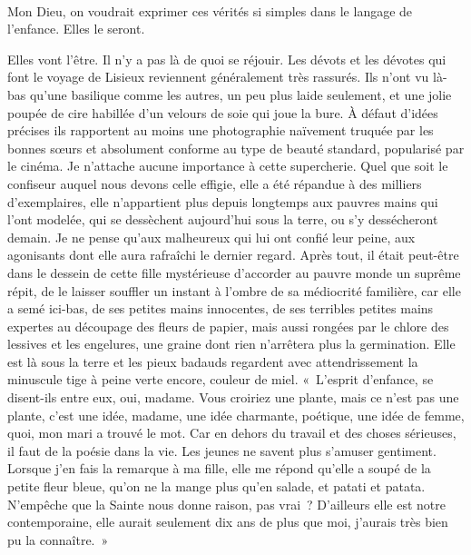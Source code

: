 \documentclass[french,twoside]{book} %
\newcommand{\astertri}{\medskip\par\centerline{\color{rubric}\large\selectfont{\syms ✻\,✻\,✻}}\medskip\par}%
\begin{document}
\astertri

\noindent  \par
Mon Dieu, on voudrait exprimer ces vérités si simples dans le langage de l’enfance. Elles le seront.\par
Elles vont l’être. Il n’y a pas là de quoi se réjouir. Les dévots et les dévotes qui font le voyage de Lisieux reviennent généralement très rassurés. Ils n’ont vu là-bas qu’une basilique comme les autres, un peu plus laide seulement, et une jolie poupée de cire habillée d’un velours de soie qui joue la bure. À défaut d’idées précises ils rapportent au moins une photographie naïvement truquée par les bonnes sœurs et absolument conforme au type de beauté standard, popularisé par le cinéma. Je n’attache aucune importance à cette supercherie. Quel que soit le confiseur auquel nous devons celle effigie, elle a été répandue à des milliers d’exemplaires, elle n’appartient plus depuis longtemps aux pauvres mains qui l’ont modelée, qui se dessèchent aujourd’hui sous la terre, ou s’y dessécheront demain. Je ne pense qu’aux malheureux qui lui ont confié leur peine, aux agonisants dont elle aura rafraîchi le dernier regard. Après tout, il était peut-être dans le dessein de cette fille mystérieuse d’accorder au pauvre monde un suprême répit, de le laisser souffler un instant à l’ombre de sa médiocrité familière, car elle a semé ici-bas, de ses petites mains innocentes, de ses terribles petites mains expertes au découpage des fleurs de papier, mais aussi rongées par le chlore des lessives et les engelures, une graine dont rien n’arrêtera plus la germination. Elle est là sous la terre et les pieux badauds regardent avec attendrissement la minuscule tige à peine verte encore, couleur de miel. « L’esprit d’enfance, se disent-ils entre eux, oui, madame. Vous croiriez une plante, mais ce n’est pas une plante, c’est une idée, madame, une idée charmante, poétique, une idée de femme, quoi, mon mari a trouvé le mot. Car en dehors du travail et des choses sérieuses, il faut de la poésie dans la vie. Les jeunes ne savent plus s’amuser gentiment. Lorsque j’en fais la remarque à ma fille, elle me répond qu’elle a soupé de la petite fleur bleue, qu’on ne la mange plus qu’en salade, et patati et patata. N’empêche que la Sainte nous donne raison, pas vrai ? D’ailleurs elle est notre contemporaine, elle aurait seulement dix ans de plus que moi, j’aurais très bien pu la connaître. »\par
 \par

\astertri
\end{document}

